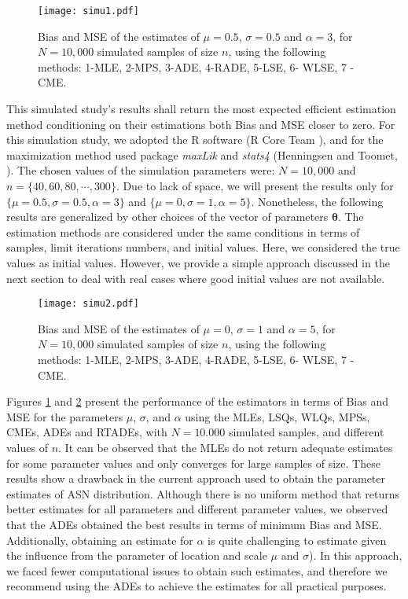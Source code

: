 \documentclass[]{interact}
\theoremstyle{plain}%
\theoremstyle{definition}
\theoremstyle{remark}
\begin{document}
\begin{figure}[!t]
\centering
\texttt{[image: simu1.pdf]}
\caption{Bias and MSE of the estimates of $\mu=0.5$, $\sigma=0.5$ and $\alpha=3$, for $N=10,000$ simulated samples of size $n$, using the following methods: 1-MLE, 2-MPS, 3-ADE, 4-RADE, 5-LSE, 6- WLSE, 7 - CME.} \label{fsimulation1}
\end{figure}

This simulated study's results shall return the most expected efficient estimation method conditioning on their estimations both Bias and MSE closer to zero. For this simulation study, we adopted the R software (R Core Team \citeyear{r2014}), and for the maximization method used package \textit{maxLik} and \textit{stats4} (Henningsen and Toomet, \citeyear{henningsen2011maxlik}). The chosen values of the simulation parameters were: $N = 10,000$ and $n = \{40, 60, 80,\cdots, 300 \}$. Due to lack of space, we will present the results only for $\{ \mu=0.5, \sigma=0.5, \alpha=3\}$ and $ \{ \mu=0, \sigma=1, \alpha=5\}$. Nonetheless, the following results are generalized by other choices of the vector of parameters $\boldsymbol{\theta}$. The estimation methods are considered under the same conditions in terms of samples, limit iterations numbers, and initial values. Here, we considered the true values as initial values. However, we provide a simple approach discussed in the next section to deal with real cases where good initial values are not available.

\begin{figure}[!h]
\centering
\texttt{[image: simu2.pdf]}
\caption{Bias and MSE of the estimates of $\mu=0$, $\sigma=1$ and $\alpha=5$, for $N=10,000$ simulated samples of size $n$, using the following methods: 1-MLE, 2-MPS, 3-ADE, 4-RADE, 5-LSE, 6- WLSE, 7 - CME.} \label{fsimulation2}
\end{figure}


Figures \ref{fsimulation1} and \ref{fsimulation2}  present the performance of the estimators in terms of Bias and MSE for the parameters $\mu$, $\sigma$, and $\alpha$ using the MLEs, LSQs, WLQs, MPSs, CMEs, ADEs and RTADEs, with $N = 10.000$ simulated samples, and different values of $n$. It can be observed that the MLEs do not return adequate estimates for some parameter values and only converges for large samples of size. These results show a drawback in the current approach used to obtain the parameter estimates of ASN distribution. Although there is no uniform method that returns better estimates for all parameters and different parameter values, we observed that the ADEs obtained the best results in terms of minimum Bias and MSE. Additionally, obtaining an estimate for $\alpha$ is quite challenging to estimate given the influence from the parameter of location and scale $\mu$ and $\sigma$). In this approach, we faced fewer computational issues to obtain such estimates, and therefore we recommend using the ADEs to achieve the estimates for all practical purposes.
\end{document}
